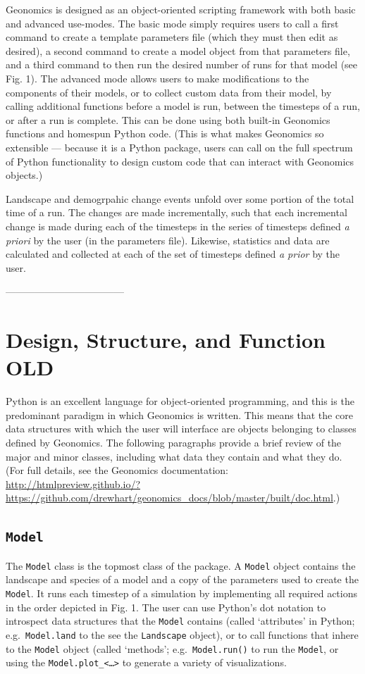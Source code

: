 ﻿\documentclass{article}
\begin{document}
Geonomics is designed as an object-oriented scripting framework with both basic and advanced use-modes.
The basic mode simply requires users to call a first command to create a template
parameters file (which they must then edit as desired), a second command to create
a model object from that parameters file, and a third command to then run the desired number
of runs for that model (see Fig. 1).
The advanced mode allows users to make modifications to the components of their models,
or to collect custom data from their model, by calling additional functions
before a model is run, between the timesteps of a run, or after a run is complete.
This can be done using both built-in Geonomics functions and homespun Python code.
(This is what makes Geonomics so extensible --- because it is a Python package, users can call on
the full spectrum of Python functionality to design custom code that can interact with Geonomics objects.)

Landscape and demogrpahic change events unfold over some portion of the total time of a run.
The changes are made incrementally, such that each incremental change is made 
during each of the timesteps in the series of timesteps defined \emph{a priori} by the user (in the parameters file).
Likewise, statistics and data are calculated and collected at each of the set of timesteps
defined \emph{a prior} by the user.




------------------------------------
\section{Design, Structure, and Function OLD}
Python is an excellent language for object-oriented programming,
and this is the predominant paradigm in which Geonomics is written.
This means that the core data structures with which the user will interface
are objects belonging to classes defined by Geonomics.
The following paragraphs provide a brief review of the major and minor classes, including
what data they contain and what they do. (For full details, see the Geonomics
documentation: \url{http://htmlpreview.github.io/?https://github.com/drewhart/geonomics\_docs/blob/master/built/doc.html}.)

\subsection{\texttt{Model}}
The \texttt{Model} class is the topmost class of the package.
A \texttt{Model} object contains the landscape and species of a model and a copy of the
parameters used to create the \texttt{Model}.
It runs each timestep of a simulation by implementing all required actions in
the order depicted in Fig. 1. 
The user can use Python's dot notation to introspect data structures that the \texttt{Model}
contains (called `attributes' in Python; e.g.\ \texttt{Model.land} to the see the
\texttt{Landscape} object), or to call functions that inhere to the \texttt{Model}
object (called `methods'; e.g.\ \texttt{Model.run()} to run the \texttt{Model},
or using the \texttt{Model.plot_<\ldots>} to generate a variety of visualizations. 
\end{document}
